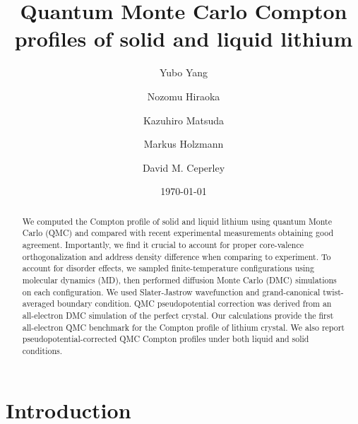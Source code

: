 \documentclass[aps,prb,showpacs,preprintnumbers,amsmath,amssymb,superscriptaddress,twocolumn]{revtex4}
\begin{document}
\title{Quantum Monte Carlo Compton profiles of solid and liquid lithium}
\author{Yubo Yang}
\author{Nozomu Hiraoka}
\author{Kazuhiro Matsuda}
\author{Markus Holzmann}
\author{David M. Ceperley}
\date{\today}
\begin{abstract}
We computed the Compton profile of solid and liquid lithium using quantum Monte Carlo (QMC) and compared with recent experimental measurements obtaining good agreement. Importantly, we find it crucial to account for proper core-valence orthogonalization and address density difference when comparing to experiment. To account for disorder effects, we sampled finite-temperature configurations using molecular dynamics (MD), then performed diffusion Monte Carlo (DMC) simulations on each configuration. We used Slater-Jastrow wavefunction and grand-canonical twist-averaged boundary condition. QMC pseudopotential correction was derived from an all-electron DMC simulation of the perfect crystal. Our calculations provide the first all-electron QMC benchmark for the Compton profile of lithium crystal. We also report pseudopotential-corrected QMC Compton profiles under both liquid and solid conditions.
\end{abstract}
\pacs{}
\maketitle

\section{Introduction} \label{sec:intro}
\end{document}
